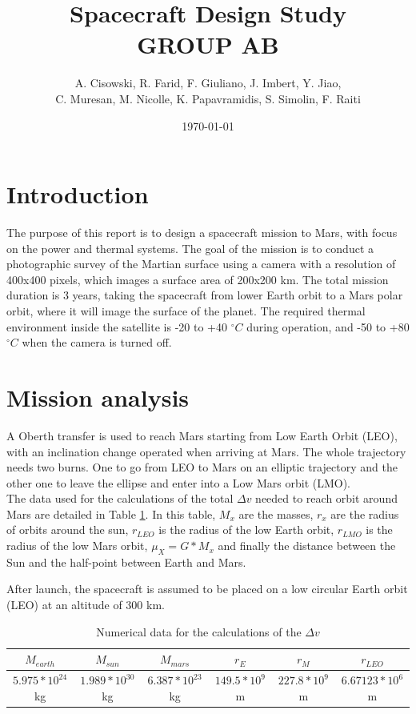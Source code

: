 \documentclass[a4paper, oneside, 11pt]{article}
\title{\Huge{Spacecraft Design Study} \\ GROUP AB}
\author{A. Cisowski, R. Farid, F. Giuliano, J. Imbert, Y. Jiao,\\ C. Muresan, M. Nicolle, K. Papavramidis, S. Simolin, F. Raiti\\}
\date{\today}
\begin{document}
\maketitle

\clearpage

\tableofcontents

\clearpage 



\section{Introduction}
 
The purpose of this report is to design a spacecraft mission to Mars, with focus on the power and thermal systems. The goal of the mission is to conduct a photographic survey of the Martian surface using a camera with a resolution of 400x400 pixels, which images a surface area of 200x200 km. The total mission duration is 3 years, taking the spacecraft from lower Earth orbit to a Mars polar orbit, where it will image the surface of the planet. The required thermal environment inside the satellite is -20 to +40 $^{\circ}C$ during operation, and -50 to +80 $^{\circ}C$ when the camera is turned off. \\
  

\section{Mission analysis}

A Oberth transfer is used to reach Mars starting from Low Earth Orbit (LEO), with an inclination change operated when arriving at Mars.
The whole trajectory needs two burns. One to go from LEO to Mars on an elliptic trajectory and the other one to leave the ellipse and enter into a Low Mars orbit (LMO).\\
The data used for the calculations of the total $\Delta v$ needed to reach orbit around Mars are detailed in Table \ref{data}. In this table, $M_x$ are the masses, $r_x$ are the radius of orbits around the sun, $r_{LEO}$ is the radius of the low Earth orbit, $r_{LMO}$ is the radius of the low Mars orbit, $\mu_{X}=G*M_x$ and finally the distance between the Sun and the half-point between Earth and Mars.

\noindent After launch, the spacecraft is assumed to be placed on a low circular Earth orbit (LEO) at an altitude of 300 km. 

\begin{table}[!h]
 \caption{Numerical data for the calculations of the $\Delta v$}
 \label{data}
\centering
 \begin{tabular}{| c | c |c |c |c | c|}
  \hline
 $M_{earth}$ & $M_{sun}$ & $M_{mars}$ & $r_{E}$ & $r_{M}$ & $r_{LEO}$ \\
     \hline
  $5.975*10^{24}$ kg & $1.989*10^{30}$ kg & $6.387*10^{23}$ kg & $149.5*10^9$ m& $227.8*10^9$ m & $6.67123*10^6$ m\\
     \hline
\end{tabular}
\end{table}
\end{document}
